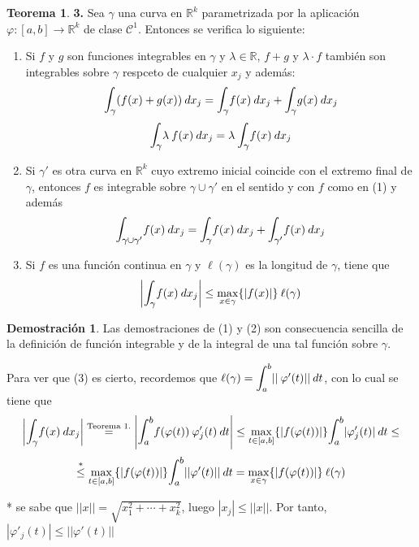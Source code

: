 \documentclass[12pt,twoside]{report}
\theoremstyle{azul}
\theoremstyle{azul2}
\theoremstyle{plain}
\theoremstyle{definition}
\newtheorem*{dem}{Demostración}
\newtheorem*{theo}{Teorema}
\theoremstyle{remark}
\begin{document}
\begin{theo} \textbf{3.} Sea $\gamma$ una curva en $\mathbb{R}^k$ parametrizada por la aplicación $\varphi : [a,b] \longrightarrow \mathbb{R}^k$ de clase $\mathcal{C}^1$. Entonces se verifica lo siguiente:
\begin{enumerate}[(1)]
    \item Si $f$ y $g$ son funciones integrables en $\gamma$ y $\lambda \in \mathbb{R}$, $f+g$ y $\lambda \cdot f$ también son integrables sobre $\gamma$ respceto de cualquier $x_j$ y además: $$\mathlarger{\int_{\gamma}}(f(x)+g(x)) \: d x_j = \mathlarger{\int_{\gamma}}f(x) \: d x_j + \mathlarger{\int_{\gamma}}g(x) \: d x_j $$  $$\mathlarger{\int_{\gamma}}\lambda \: f(x) \: d x_j =\lambda \: \mathlarger{\int_{\gamma}}f(x) \: d x_j $$
    \item Si $\gamma'$ es otra curva en $\mathbb{R}^k$ cuyo extremo inicial coincide con el extremo final de $\gamma$, entonces $f$ es integrable sobre $\gamma \cup \gamma'$ en el sentido y con $f$ como en (1) y además $$\mathlarger{\int_{\gamma \cup \gamma'}}f(x) \: d x_j = \mathlarger{\int_{\gamma}}f(x) \: d x_j + \mathlarger{\int_{\gamma'}}f(x) \: d x_j$$
    \item Si $f$ es una función continua en $\gamma$ y $\ell(\gamma)$  es la longitud de $\gamma$, tiene que $$\left| \mathlarger{\int_{\gamma}} f(x) \: dx_j \right| \leq \underset{x \in \gamma}{\max} \{ |f(x)|\} \: \ell(\gamma)$$
\end{enumerate}
\end{theo}
\begin{dem}


Las demostraciones de (1) y (2) son consecuencia sencilla de la definición de función integrable y de la integral de una tal función sobre $\gamma$. 

Para ver que (3) es cierto, recordemos que $\ell(\gamma)=\mathlarger{\int_a^b} ||\: \varphi'(t)|| \: dt$, con lo cual se tiene que $$\left| \mathlarger{\int_{\gamma}} f(x) \: dx_j \right| \overset{\text{Teorema 1.}}{=} \left| \mathlarger{\int_a^b} f(\varphi(t)) \: \varphi_j '(t) \: dt \right| \leq \underset{t \in [a,b]}{\max} \{ |f(\varphi(t))| \} \mathlarger{\int_a^b} | \varphi_j '(t) | \: dt \leq $$
$$ \overset{*}{\leq} \underset{t \in [a,b]}{\max} \{ |f(\varphi(t))| \} \mathlarger{\int_a^b} ||\varphi ' (t)|| \: dt = \underset{x \in \gamma}{\max} \{ |f(\varphi(t))| \} \: \ell(\gamma)$$

* se sabe que $||x||=\sqrt{x_1^2 + \cdots + x_k^2}$, luego $|x_j| \leq ||x||$. Por tanto, $|\varphi'_j(t)| \leq ||\varphi ' (t)||$

\end{dem}
\end{document}
